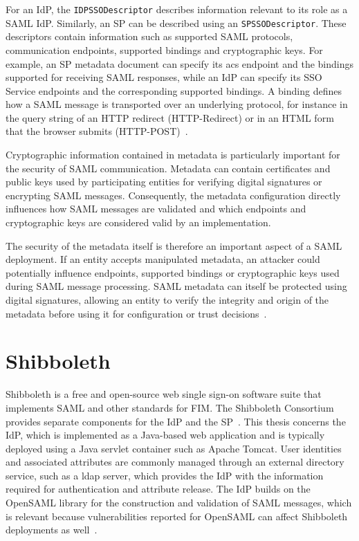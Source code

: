 \documentclass[../main.tex]{subfiles}
\begin{document}
For an IdP, the \texttt{IDPSSODescriptor} describes information relevant to its role as a SAML IdP. 
Similarly, an SP can be described using an \texttt{SPSSODescriptor}. 
These descriptors contain information such as supported SAML protocols, communication endpoints, 
supported bindings and cryptographic keys. 
For example, an SP metadata document can specify its \gls{acs} endpoint and the bindings supported 
for receiving SAML responses, while an IdP can specify its SSO Service endpoints and the corresponding 
supported bindings. 
A binding defines how a SAML message is transported over an underlying protocol, for instance in the 
query string of an HTTP redirect (HTTP-Redirect) or in an HTML form that the browser submits 
(HTTP-POST)~\cite{SAMLBinding}. 

Cryptographic information contained in metadata is particularly important for the security of SAML 
communication. 
Metadata can contain certificates and public keys used by participating entities for verifying digital 
signatures or encrypting SAML messages. 
Consequently, the metadata configuration directly influences how SAML messages are validated and which 
endpoints and cryptographic keys are considered valid by an implementation.

The security of the metadata itself is therefore an important aspect of a SAML deployment. 
If an entity accepts manipulated metadata, an attacker could potentially influence endpoints, 
supported bindings or cryptographic keys used during SAML message processing. 
SAML metadata can itself be protected using digital signatures, allowing an entity to verify the integrity 
and origin of the metadata before using it for configuration or trust decisions~\cite{SAMLMetadata}.

\section{Shibboleth}\label{sec:shibboleth}

Shibboleth is a free and open-source web single sign-on software suite that 
implements SAML and other standards for FIM. 
The Shibboleth Consortium provides separate components for the IdP and the SP~\cite{Shibboleth}. 
This thesis concerns the IdP, which is implemented as a Java-based web application and is typically 
deployed using a Java servlet container such as Apache Tomcat. 
User identities and associated attributes are commonly managed through an external 
directory service, such as a \gls{ldap} server, which provides the IdP with the 
information required for authentication and attribute release. 
The IdP builds on the OpenSAML library for the construction and validation of SAML messages, which is relevant 
because vulnerabilities reported for OpenSAML can affect Shibboleth deployments as well~\cite{ShibbolethGIAC}.
\end{document}

